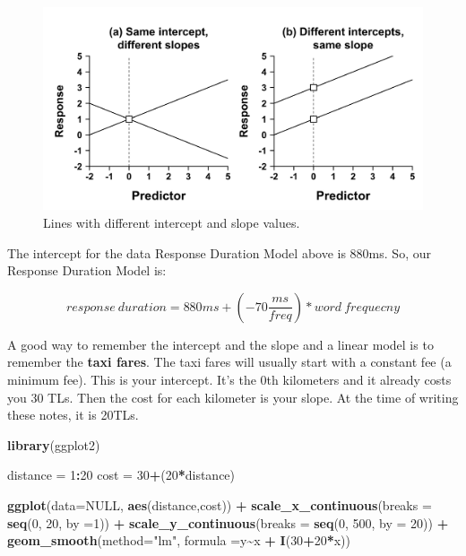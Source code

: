 \documentclass[
]{book}
\newenvironment{Shaded}{\begin{snugshade}}{\end{snugshade}}
\newcommand{\AttributeTok}[1]{\textcolor[rgb]{0.13,0.29,0.53}{#1}}
\newcommand{\ConstantTok}[1]{\textcolor[rgb]{0.56,0.35,0.01}{#1}}
\newcommand{\DecValTok}[1]{\textcolor[rgb]{0.00,0.00,0.81}{#1}}
\newcommand{\FunctionTok}[1]{\textcolor[rgb]{0.13,0.29,0.53}{\textbf{#1}}}
\newcommand{\NormalTok}[1]{#1}
\newcommand{\OtherTok}[1]{\textcolor[rgb]{0.56,0.35,0.01}{#1}}
\newcommand{\SpecialCharTok}[1]{\textcolor[rgb]{0.81,0.36,0.00}{\textbf{#1}}}
\newcommand{\StringTok}[1]{\textcolor[rgb]{0.31,0.60,0.02}{#1}}
\begin{document}
\begin{figure}
\centering
\includegraphics{./img/lr/lr2.png}
\caption{\label{fig:interceptslope}Lines with different intercept and slope values.}
\end{figure}

The intercept for the data Response Duration Model above is 880ms. So, our Response Duration Model is:

\[response\ duration = 880ms + (-70 \frac{ms}{freq}) * word\ frequecny   \]

A good way to remember the intercept and the slope and a linear model is to remember the \textbf{taxi fares}. The taxi fares will usually start with a constant fee (a minimum fee). This is your intercept. It's the 0th kilometers and it already costs you 30 TLs. Then the cost for each kilometer is your slope. At the time of writing these notes, it is 20TLs.

\begin{Shaded}
\begin{Highlighting}[]
\FunctionTok{library}\NormalTok{(ggplot2)}

\NormalTok{distance }\OtherTok{=} \DecValTok{1}\SpecialCharTok{:}\DecValTok{20}
\NormalTok{cost }\OtherTok{=} \DecValTok{30}\SpecialCharTok{+}\NormalTok{(}\DecValTok{20}\SpecialCharTok{*}\NormalTok{distance)}

\FunctionTok{ggplot}\NormalTok{(}\AttributeTok{data=}\ConstantTok{NULL}\NormalTok{, }\FunctionTok{aes}\NormalTok{(distance,cost)) }\SpecialCharTok{+}
  \FunctionTok{scale\_x\_continuous}\NormalTok{(}\AttributeTok{breaks =} \FunctionTok{seq}\NormalTok{(}\DecValTok{0}\NormalTok{, }\DecValTok{20}\NormalTok{, }\AttributeTok{by =}\DecValTok{1}\NormalTok{)) }\SpecialCharTok{+}
  \FunctionTok{scale\_y\_continuous}\NormalTok{(}\AttributeTok{breaks =} \FunctionTok{seq}\NormalTok{(}\DecValTok{0}\NormalTok{, }\DecValTok{500}\NormalTok{, }\AttributeTok{by =} \DecValTok{20}\NormalTok{)) }\SpecialCharTok{+} 
  \FunctionTok{geom\_smooth}\NormalTok{(}\AttributeTok{method=}\StringTok{"lm"}\NormalTok{, }\AttributeTok{formula =}\NormalTok{y}\SpecialCharTok{\textasciitilde{}}\NormalTok{x }\SpecialCharTok{+} \FunctionTok{I}\NormalTok{(}\DecValTok{30}\SpecialCharTok{+}\DecValTok{20}\SpecialCharTok{*}\NormalTok{x))}
\end{Highlighting}
\end{Shaded}
\end{document}
